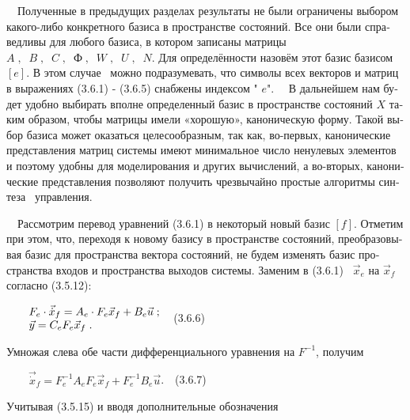 \documentclass[a4paper]{article}
\begin{document}
{\begin{russian}\sffamily
\ \ Полученные в предыдущих разделах результаты не были ограничены выбором какого-либо конкретного базиса в пространстве
состояний. Все они были справедливы для любого базиса, в котором записаны матрицы 
$A\;,\;\;B\;,\;\;C\;,\;\;Ф\;,\;\;W\;,\;\;U\;,\;\;N$. Для определённости назовём этот базис базисом  $[e]$. В этом
случае \ можно подразумевать, что символы всех векторов и матриц в выражениях (3.6.1) - (3.6.5) снабжены индексом "
$e$". \ \ В дальнейшем нам будет удобно выбирать вполне определенный базис в пространстве состояний  $X$ таким образом,
чтобы матрицы имели «хорошую», каноническую форму. Такой выбор базиса может оказаться целесообразным, так как,
во-первых, канонические представления матриц системы имеют минимальное число ненулевых элементов и поэтому удобны для
моделирования и других вычислений, а во-вторых, канонические представления позволяют получить чрезвычайно простые
алгоритмы синтеза \ управления.
\end{russian}}

{\begin{russian}\sffamily
\ \ Рассмотрим перевод уравнений (3.6.1) в некоторый новый базис  $[f]$. Отметим при этом, что, переходя к новому базису
в пространстве состояний, преобразовывая базис для пространства вектора состояний, не будем изменять базис пространства
входов и пространства выходов системы. Заменим в (3.6.1) \  $\vec x_e$ на  $\vec x_f$ согласно (3.5.12):
\end{russian}}

{\begin{russian}\sffamily
\ \ \ \  $\begin{matrix}F_e\cdot \vec{\dot x}_f=A_e\cdot F_e\vec x_f+B_e\vec u\;;\hfill\null \\\vec y=C_eF_e\vec
x_f\;.\hfill\null \end{matrix}\hfill $\ \ (3.6.6)
\end{russian}}

{\begin{russian}\sffamily
Умножая слева обе части дифференциального уравнения на  $F^{-1}$, получим
\end{russian}}

{\begin{russian}\sffamily
\ \ \ \  $\vec{\dot x}_f=F_e^{-1}A_eF_e\vec x_f+F_e^{-1}B_e\vec u$.\ \ (3.6.7)
\end{russian}}

{\begin{russian}\sffamily
Учитывая (3.5.15) и вводя дополнительные обозначения
\end{russian}}
\end{document}
